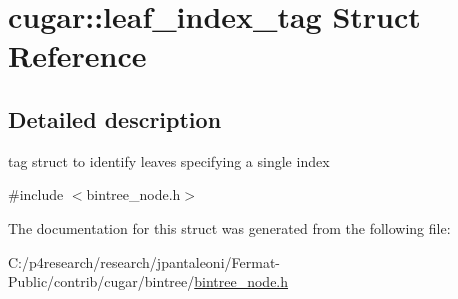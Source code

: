 \hypertarget{structcugar_1_1leaf__index__tag}{}\section{cugar\+:\+:leaf\+\_\+index\+\_\+tag Struct Reference}
\label{structcugar_1_1leaf__index__tag}


\subsection{Detailed description}
tag struct to identify leaves specifying a single index 

{\ttfamily \#include $<$bintree\+\_\+node.\+h$>$}



The documentation for this struct was generated from the following file\+:\begin{DoxyCompactItemize}
\item 
C\+:/p4research/research/jpantaleoni/\+Fermat-\/\+Public/contrib/cugar/bintree/\hyperlink{bintree__node_8h}{bintree\+\_\+node.\+h}\end{DoxyCompactItemize}
